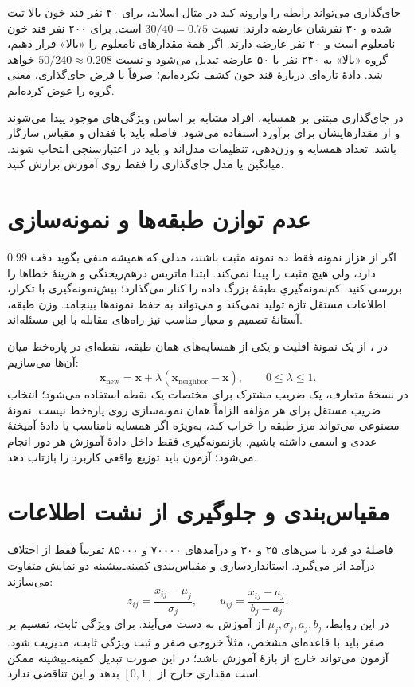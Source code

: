 \begin{example}{جای‌گذاری می‌تواند رابطه را وارونه کند}
در مثال اسلاید، برای ۴۰ نفر قند خون بالا ثبت شده و ۳۰ نفرشان عارضه دارند: نسبت $30/40=0.75$ است. برای ۲۰۰ نفر قند خون نامعلوم است و ۲۰ نفر عارضه دارند. اگر همهٔ مقدارهای نامعلوم را «بالا» قرار دهیم، گروه «بالا» به ۲۴۰ نفر با ۵۰ عارضه تبدیل می‌شود و نسبت $50/240\approx0.208$ خواهد شد. دادهٔ تازه‌ای دربارهٔ قند خون کشف نکرده‌ایم؛ صرفاً با فرض جای‌گذاری، معنی گروه را عوض کرده‌ایم.
\end{example}

در جای‌گذاری مبتنی بر همسایه، افراد مشابه بر اساس ویژگی‌های موجود پیدا می‌شوند و از مقدارهایشان برای برآورد استفاده می‌شود. فاصله باید با فقدان و مقیاس سازگار باشد. تعداد همسایه و وزن‌دهی، تنظیمات مدل‌اند و باید در اعتبارسنجی انتخاب شوند. میانگین یا مدل جای‌گذاری را فقط روی آموزش برازش کنید.

\section{عدم توازن طبقه‌ها و نمونه‌سازی}
اگر از هزار نمونه فقط ده نمونه مثبت باشند، مدلی که همیشه منفی بگوید دقت $0.99$ دارد، ولی هیچ مثبت را پیدا نمی‌کند. ابتدا ماتریس درهم‌ریختگی و هزینهٔ خطاها را بررسی کنید. کم‌نمونه‌گیریِ طبقهٔ بزرگ داده را کنار می‌گذارد؛ بیش‌نمونه‌گیری با تکرار، اطلاعات مستقل تازه تولید نمی‌کند و می‌تواند به حفظ نمونه‌ها بینجامد. وزن طبقه، آستانهٔ تصمیم و معیار مناسب نیز راه‌های مقابله با این مسئله‌اند.

در ، از یک نمونهٔ اقلیت و یکی از همسایه‌های همان طبقه، نقطه‌ای در پاره‌خط میان آن‌ها می‌سازیم:
\[\mathbf x_{\mathrm{new}}=\mathbf x+\lambda(\mathbf x_{\mathrm{neighbor}}-\mathbf x),\qquad 0\le\lambda\le1.\]
در نسخهٔ متعارف، یک ضریب مشترک برای مختصات یک نقطه استفاده می‌شود؛ انتخاب ضریب مستقل برای هر مؤلفه الزاماً همان نمونه‌سازی روی پاره‌خط نیست. نمونهٔ مصنوعی می‌تواند مرز طبقه را خراب کند، به‌ویژه اگر همسایه نامناسب یا دادهٔ آمیختهٔ عددی و اسمی داشته باشیم. بازنمونه‌گیری فقط داخل دادهٔ آموزش هر دور انجام می‌شود؛ آزمون باید توزیع واقعی کاربرد را بازتاب دهد.

\section{مقیاس‌بندی و جلوگیری از نشت اطلاعات}
فاصلهٔ دو فرد با سن‌های ۲۵ و ۳۰ و درآمدهای ۷۰۰۰۰ و ۸۵۰۰۰ تقریباً فقط از اختلاف درآمد اثر می‌گیرد. استانداردسازی و مقیاس‌بندی کمینه‌ـ‌بیشینه دو نمایش متفاوت می‌سازند:
\[z_{ij}=\frac{x_{ij}-\mu_j}{\sigma_j},\qquad u_{ij}=\frac{x_{ij}-a_j}{b_j-a_j}.\]
در این روابط، $\mu_j,\sigma_j,a_j,b_j$ از آموزش به دست می‌آیند. برای ویژگی ثابت، تقسیم بر صفر باید با قاعده‌ای مشخص، مثلاً خروجی صفر و ثبت ویژگی ثابت، مدیریت شود. آزمون می‌تواند خارج از بازهٔ آموزش باشد؛ در این صورت تبدیل کمینه‌ـ‌بیشینه ممکن است مقداری خارج از $[0,1]$ بدهد و این تناقضی ندارد.

